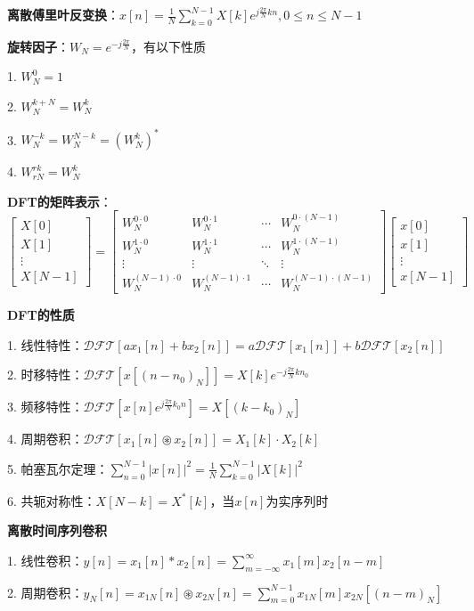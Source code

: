\textbf{离散傅里叶反变换}：$x[n] = \frac{1}{N}\sum_{k=0}^{N-1}X[k]e^{j\frac{2\pi}{N}kn}, 0 \leq n \leq N-1$

\textbf{旋转因子}：$W_N = e^{-j\frac{2\pi}{N}}$，有以下性质

1. $W_N^0 = 1$

2. $W_N^{k+N} = W_N^k$

3. $W_N^{-k} = W_N^{N-k} = (W_N^k)^*$

4. $W_{rN}^{rk} = W_N^k$

\textbf{DFT的矩阵表示}：
$\begin{bmatrix} X[0] \\ X[1] \\ \vdots \\ X[N-1] \end{bmatrix} = 
\begin{bmatrix} 
W_N^{0\cdot0} & W_N^{0\cdot1} & \cdots & W_N^{0\cdot(N-1)} \\
W_N^{1\cdot0} & W_N^{1\cdot1} & \cdots & W_N^{1\cdot(N-1)} \\
\vdots & \vdots & \ddots & \vdots \\
W_N^{(N-1)\cdot0} & W_N^{(N-1)\cdot1} & \cdots & W_N^{(N-1)\cdot(N-1)}
\end{bmatrix}
\begin{bmatrix} x[0] \\ x[1] \\ \vdots \\ x[N-1] \end{bmatrix}$

\textbf{DFT的性质}

1. 线性特性：$\mathcal{DFT}[ax_1[n]+bx_2[n]] = a\mathcal{DFT}[x_1[n]]+b\mathcal{DFT}[x_2[n]]$

2. 时移特性：$\mathcal{DFT}[x[(n-n_0)_N]] = X[k]e^{-j\frac{2\pi}{N}kn_0}$

3. 频移特性：$\mathcal{DFT}[x[n]e^{j\frac{2\pi}{N}k_0n}] = X[(k-k_0)_N]$

4. 周期卷积：$\mathcal{DFT}[x_1[n] \circledast x_2[n]] = X_1[k] \cdot X_2[k]$

5. 帕塞瓦尔定理：$\sum_{n=0}^{N-1}|x[n]|^2 = \frac{1}{N}\sum_{k=0}^{N-1}|X[k]|^2$

6. 共轭对称性：$X[N-k] = X^*[k]$，当$x[n]$为实序列时

\textbf{离散时间序列卷积}

1. 线性卷积：$y[n] = x_1[n] * x_2[n] = \sum_{m=-\infty}^{\infty}x_1[m]x_2[n-m]$

2. 周期卷积：$y_N[n] = x_{1N}[n] \circledast x_{2N}[n] = \sum_{m=0}^{N-1}x_{1N}[m]x_{2N}[(n-m)_N]$


